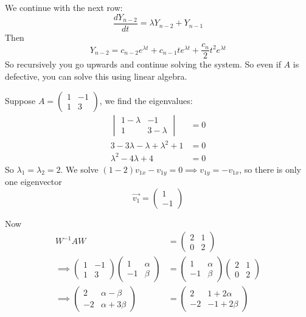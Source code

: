 \documentclass[10pt]{scrartcl}
\renewcommand{\l}{\lambda}
\begin{document}
We continue with the next row:
\[
  \frac{dY_{n-2}}{dt} = \lambda Y_{n-2} + Y_{n-1}
\]
Then 
\[
  Y_{n-2} = c_{n-2}e^{\lambda t} + c_{n-1}te^{\lambda t} + \frac{c_n}{2}t^2 e^{\lambda t}
\]
So recursively you go upwards and continue solving the system. So even if $A$ is defective, you can solve this using linear algebra.\\


\begin{example} Suppose  
$A =  \begin{pmatrix}
  1 & -1 \\ 1& 3	
  \end{pmatrix}$, we find the eigenvalues:
  \begin{align*}
  \begin{vmatrix}
  1 -\lambda & -1 \\ 1 & 3-\lambda 	
  \end{vmatrix}&= 0\\
  3 - 3\lambda - \lambda + \lambda^2 + 1 &=0\\
  \l^2 - 4\l + 4 &= 0
\end{align*}
So $\l_1 = \l_2 = 2$. We solve $(1-2)v_{1x} - v_{1y} = 0 \implies v_{1y} = -v_{1x}$, so there is only one eigenvector
\[
  \vec{v_1} = \begin{pmatrix}
  1 \\ -1
\end{pmatrix}
\]

Now 
\begin{align*}
  W^{-1}AW &=
  \begin{pmatrix}
  2 & 1\\ 0 & 2
\end{pmatrix}\\[.3cm]
\implies 
\begin{pmatrix}
  1 & -1 \\ 1 & 3
\end{pmatrix}
\begin{pmatrix}
  1 & \alpha \\ -1 & \beta 
\end{pmatrix} &= \begin{pmatrix}
  1 & \alpha \\ -1 & \beta 
\end{pmatrix}
\begin{pmatrix}
  2 & 1\\ 0 & 2
\end{pmatrix}\\
\implies 
\begin{pmatrix}
  2 & \alpha - \beta \\
   -2 & \alpha + 3\beta
\end{pmatrix}
&= 
\begin{pmatrix}
  2 & 1 + 2\alpha\\ -2 & -1 + 2\beta
\end{pmatrix}
\end{align*}


\end{example}
\end{document}
